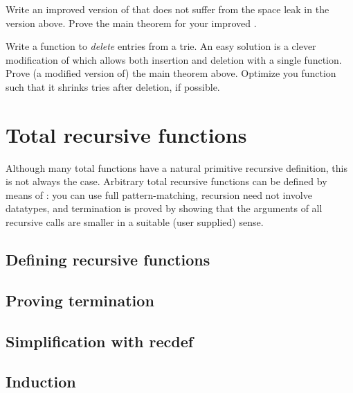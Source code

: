 \begin{exercise}
  Write an improved version of  that does not suffer from the
  space leak in the version above. Prove the main theorem for your improved
  .
\end{exercise}

\begin{exercise}
  Write a function to \emph{delete} entries from a trie. An easy solution is
  a clever modification of  which allows both insertion and
  deletion with a single function.  Prove (a modified version of) the main
  theorem above. Optimize you function such that it shrinks tries after
  deletion, if possible.
\end{exercise}

\section{Total recursive functions}
\label{sec:recdef}

Although many total functions have a natural primitive recursive definition,
this is not always the case. Arbitrary total recursive functions can be
defined by means of : you can use full pattern-matching,
recursion need not involve datatypes, and termination is proved by showing
that the arguments of all recursive calls are smaller in a suitable (user
supplied) sense.

\subsection{Defining recursive functions}



\subsection{Proving termination}



\subsection{Simplification with recdef}
\label{sec:recdef-simplification}



\subsection{Induction}


\label{sec:recdef-induction}

